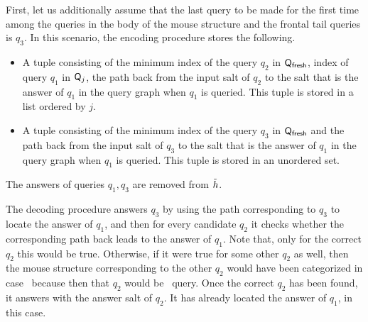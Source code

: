 {
First, let us additionally assume that the last query to be made for the first time among the queries in the body of the mouse structure and the frontal tail queries is $q_3$.
In this scenario, the encoding procedure stores the following.
\begin{itemize}
  \item A tuple consisting of the minimum index of the query $q_2$ in $\mathsf{Q}_\textsf{fresh}$, index of query $q_1$ in $\mathsf{Q}_j$, the path back from the input salt of $q_2$ to the salt that is the answer of $q_1$ in the query graph when $q_1$ is queried. This tuple is stored in a list ordered by $j$.
  \item A tuple consisting of the minimum index of the query $q_3$ in $\mathsf{Q}_\textsf{fresh}$ and the path back from the input salt of $q_3$ to the salt that is the answer of $q_1$ in the query graph when $q_1$ is queried. This tuple is stored in an unordered set.
\end{itemize}
The answers of queries $q_1,q_3$ are removed from $\tilde{h}$.
 
 The decoding procedure answers $q_3$ by using the path corresponding to $q_3$ to locate the answer of $q_1$, and then for every candidate $q_2$ it checks whether the corresponding path back leads to the answer of $q_1$. Note that, only for the correct $q_2$ this would be true. Otherwise, if it were true for some other $q_2$ as well, then the mouse structure corresponding to the other $q_2$ would have been categorized in case~ because then that $q_2$ would be \frep\ query.
 Once the correct $q_2$ has been found, it answers with the answer salt of $q_2$. It has already located the answer of $q_1$, in this case.

}
